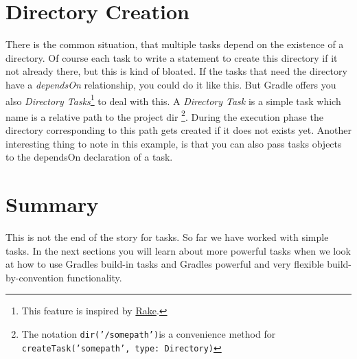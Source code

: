 \section{Directory Creation} %
There is the common situation, that multiple tasks depend on the existence of a directory. Of course each task to write a statement to create this directory if it not already there, but this is kind of bloated. If the tasks that need the directory have a \emph{dependsOn} relationship, you could do it like this.
But Gradle offers you also \emph{Directory Tasks}\footnote{This feature is inspired by \href{http://rake.rubyforge.org/}{Rake}.} to deal with this.
A \emph{Directory Task} is a simple task which name is a relative path to the project dir
\footnote{The notation \texttt{dir('/somepath')}is a convenience method for \texttt{createTask('somepath', type: Directory)}}. During the execution phase the directory corresponding to this path gets created if it does not exists yet. Another interesting thing to note in this example, is that you can also pass tasks objects to the dependsOn declaration of a task.
\label{sec:directory_creation}


\section{Summary}
This is not the end of the story for tasks. So far we have worked with simple tasks. In the next sections you will learn about more powerful tasks when we look at how to use Gradles build-in tasks and Gradles powerful and very flexible build-by-convention functionality.

